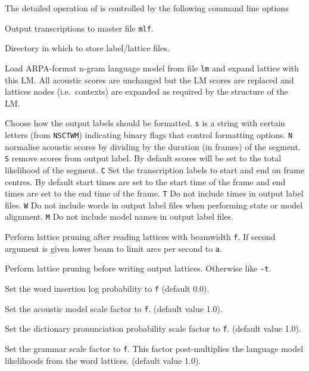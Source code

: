 The detailed operation of  is controlled by the following
command line options
\begin{optlist}

   Output transcriptions to master file \texttt{mlf}.

   Directory in which to store label/lattice files.

   Load ARPA-format n-gram language model from file
  \texttt{lm} and expand lattice with this LM. All acoustic scores are
  unchanged but the LM scores are replaced and lattices nodes (i.e.\
  contexts) are expanded as required by the structure of the LM.

   Choose how the output labels should be formatted.
        \texttt{s} is a string with certain letters (from \texttt{NSCTWM})
        indicating binary flags that control formatting options.
        \texttt{N} normalise acoustic scores by dividing by the duration
        (in frames) of the segment.
        \texttt{S} remove scores from output label.  By default 
        scores will be set to the total likelihood of the segment.
        \texttt{C} Set the transcription labels to start and end on
        frame centres. By default start times are set to the start
        time of the frame and end times are set to the end time of 
        the frame.
        \texttt{T} Do not include times in output label files.
        \texttt{W} Do not include words in output label files
        when performing state or model alignment.
        \texttt{M} Do not include model names in output label
        files.

   Perform lattice pruning after reading lattices with
  beamwidth \texttt{f}. If second argument is given lower beam to
  limit arcs per second to \texttt{a}.

   Perform lattice pruning before writing output
  lattices. Otherwise like \texttt{-t}.

   Set the word insertion log probability to \texttt{f} 
  (default 0.0).
  
   Set the acoustic model scale factor to \texttt{f}.
  (default value 1.0).

   Set the dictionary pronunciation probability scale 
        factor to \texttt{f}. (default value 1.0).

   Set the grammar scale factor to \texttt{f}.
        This factor post-multiplies the language model likelihoods
        from the word lattices.  (default value 1.0).


\end{optlist}
